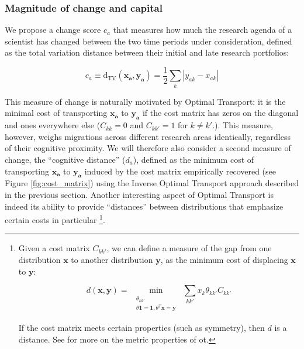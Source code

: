 \documentclass{article}
\begin{document}
\subsubsection{Magnitude of change and capital}

We propose a change score $c_a$ that measures how much the research agenda of a scientist has changed between the two time periods under consideration, defined as the total variation distance between their initial and late research portfolios:

\begin{equation}
    c_a \equiv \mathrm{d}_{\text{TV}}(\bm{x_a},\bm{y_a}) = \frac{1}{2} \sum_k |y_{ak}-x_{ak}|
\end{equation}

This measure of change is naturally motivated by Optimal Transport: it is the minimal cost of transporting $\bm{x_a}$ to $\bm{y_a}$ if the cost matrix has zeros on the diagonal and ones everywhere else ($C_{kk}=0$ and $C_{kk'}=1$ for $k\neq k'$.). This measure, however, weighs migrations across different research areas identically, regardless of their cognitive proximity. We will therefore also consider a second measure of change, the ``cognitive distance'' ($d_a$), defined as the minimum cost of transporting $\bm{x_a}$ to $\bm{y_a}$ \citep{Peyr2019} induced by the cost matrix empirically recovered (see Figure \ref{fig:cost_matrix}) using the Inverse Optimal Transport approach described in the previous section. Another interesting aspect of Optimal Transport is indeed its ability to provide ``distances'' between distributions that emphasize certain costs in particular \footnote{Given a cost matrix $C_{kk'}$, we can define a measure of the gap from one distribution $\bm{x}$ to another distribution $\bm{y}$, as the minimum cost of displacing $\bm{x}$ to $\bm{y}$:

\begin{equation}
    d(\bm{x},\bm{y}) = \min_{\substack{\substack{\theta_{kk'}\\\theta \bm{1}=\bm{1}, \theta^T \bm{x} = \bm{y}}}} \sum_{kk'} x_k \theta_{kk'} C_{kk'}
\end{equation}

If the cost matrix meets certain properties (such as symmetry), then $d$ is a distance. See \citealt{Peyr2019} for more on the metric properties of \gls{ot}.}.
\end{document}
